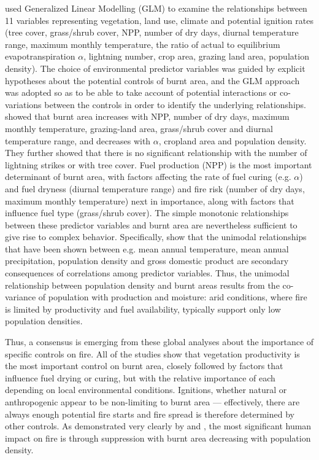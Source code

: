 \documentclass[12pt]{article}
\begin{document}
\citet{bistinas2014causal} used Generalized Linear Modelling (GLM) to examine the relationships between 11 variables representing vegetation, land use, climate and potential ignition rates (tree cover, grass/shrub cover, NPP, number of dry days, diurnal temperature range, maximum monthly temperature, the ratio of actual to equilibrium evapotranspiration $\alpha$, lightning number, crop area, grazing land area, population density).  The choice of environmental predictor variables was guided by explicit hypotheses about the potential controls of burnt area, and the GLM approach was adopted so as to be able to take account of potential interactions or co-variations between the controls in order to identify the underlying relationships.  \citet{bistinas2014causal} showed that burnt area increases with NPP, number of dry days, maximum monthly temperature, grazing-land area, grass/shrub cover and diurnal temperature range, and decreases with $\alpha$, cropland area and population density. They further showed that there is no significant relationship with the number of lightning strikes or with tree cover. Fuel production (NPP) is the most important determinant of burnt area, with factors affecting the rate of fuel curing (e.g. $\alpha$) and fuel dryness (diurnal temperature range) and fire risk (number of dry days, maximum monthly temperature) next in importance, along with factors that influence fuel type (grass/shrub cover). The simple monotonic relationships between these predictor variables and burnt area are nevertheless sufficient to give rise to complex behavior. Specifically, \citet{bistinas2014causal} show that the unimodal relationships that have been shown between e.g. mean annual temperature, mean annual precipitation, population density and gross domestic product are secondary consequences of correlations among predictor variables. Thus, the unimodal relationship between population density and burnt areas results from the co-variance of population with production and moisture: arid conditions, where fire is limited by productivity and fuel availability, typically support only low population densities.

Thus, a consensus is emerging from these global analyses about the importance of specific controls on fire. All of the studies show that vegetation productivity is the most important control on burnt area, closely followed by factors that influence fuel drying or curing, but with the relative importance of each depending on local environmental conditions. Ignitions, whether natural or anthropogenic appear to be non-limiting to burnt area --- effectively, there are always enough potential fire starts and fire spread is therefore determined by other controls. As demonstrated very clearly by \citet{Knorr2013} and \citet{Bistinas}, the most significant human impact on fire is through suppression with burnt area decreasing with population density.
\end{document}
